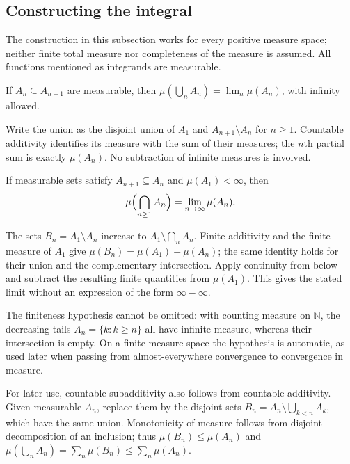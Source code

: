 \subsection{Constructing the integral}
The construction in this subsection works for every positive measure
space; neither finite total measure nor completeness of the measure is
assumed. All functions mentioned as integrands are measurable.

\begin{lemma}
If $A_n\subseteq A_{n+1}$ are measurable, then
$\mu(\bigcup_nA_n)=\lim_n\mu(A_n)$, with infinity allowed.
\end{lemma}
\Proof
Write the union as the disjoint union of $A_1$ and
$A_{n+1}\setminus A_n$ for $n\geq1$. Countable additivity identifies its
measure with the sum of their measures; the $n$th partial sum is exactly
$\mu(A_n)$. No subtraction of infinite measures is involved.
\Done

\begin{lemma}
\label{lem:measure_continuity_above}
If measurable sets satisfy $A_{n+1}\subseteq A_n$ and
$\mu(A_1)<\infty$, then
\[
\mu\Bigl(\bigcap_{n\geq1}A_n\Bigr)=\lim_{n\to\infty}\mu(A_n).
\]
\end{lemma}
\Proof
The sets $B_n=A_1\setminus A_n$ increase to
$A_1\setminus\bigcap_n A_n$. Finite additivity and the finite measure
of $A_1$ give $\mu(B_n)=\mu(A_1)-\mu(A_n)$; the same identity holds
for their union and the complementary intersection. Apply continuity
from below and subtract the resulting finite quantities from
$\mu(A_1)$. This gives the stated limit without an expression of the
form $\infty-\infty$.
\Done

The finiteness hypothesis cannot be omitted: with counting measure on
$\mathbb N$, the decreasing tails $A_n=\{k:k\geq n\}$ all have
infinite measure, whereas their intersection is empty. On a finite
measure space the hypothesis is automatic, as used later when passing
from almost-everywhere convergence to convergence in measure.

For later use, countable subadditivity also follows from countable
additivity. Given measurable $A_n$, replace them by the disjoint sets
$B_n=A_n\setminus\bigcup_{k<n}A_k$, which have the same union.
Monotonicity of measure follows from disjoint decomposition of an inclusion;
thus $\mu(B_n)\leq\mu(A_n)$ and
$\mu(\bigcup_nA_n)=\sum_n\mu(B_n)\leq\sum_n\mu(A_n)$.

